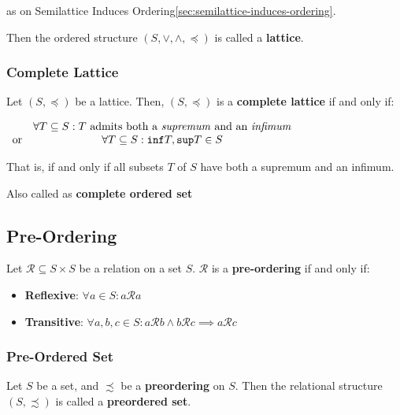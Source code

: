 as on Semilattice Induces
Ordering\ref{sec:semilattice-induces-ordering}.

Then the ordered structure $(S, \vee, \wedge, \preceq)$ is called a
\textbf{lattice}.


\subsubsection{Complete Lattice}
\label{sec:complete-lattice}

Let $(S, \preceq)$ be a lattice. Then, $(S, \preceq)$ is a
\textbf{complete lattice} if and only if:

\begin{math}
  \begin{array}{lc}
    & \forall T \subseteq S: T \text{ admits both a \textit{supremum} and an \textit{infimum}} \\
    \text{or} & \forall T \subseteq S: \mathtt{inf}T, \mathtt{sup}T \in S \\
  \end{array}
\end{math}

That is, if and only if all subsets $T$ of $S$ have both a supremum
and an infimum.

Also called as \textbf{complete ordered set}


\subsection{Pre-Ordering}
\label{sec:pre-ordering}

Let $\mathcal{R} \subseteq S \times S$ be a relation on a set
$S$. $\mathcal{R}$ is a \textbf{pre-ordering} if and only if:

\begin{itemize}
\item \textbf{Reflexive}: $\forall a \in S: a \mathcal{R} a $
\item \textbf{Transitive}:
  $\forall a,b,c \in S: a \mathcal{R} b \land b \mathcal{R} c \implies
  a \mathcal{R} c $
\end{itemize}

\subsubsection{Pre-Ordered Set}

Let $S$ be a set, and $\precsim$ be a \textbf{preordering} on
$S$. Then the relational structure $(S, \precsim)$ is called a
\textbf{preordered set}.



